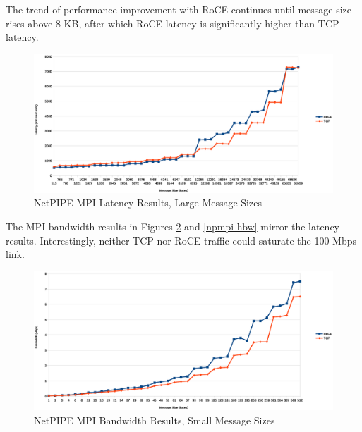 \documentclass[a4paper]{article}
\begin{document}
The trend of performance improvement with RoCE continues until message size
rises above 8 KB, after which RoCE latency is significantly higher than TCP
latency. %

\begin{figure}[H]
\includegraphics[width=\textwidth]{netpipe_lat_large}
\caption{NetPIPE MPI Latency Results, Large Message Sizes}
\label{npmpi-hlat}
\end{figure}

The MPI bandwidth results in Figures \ref{npmpi-lbw} and \ref{npmpi-hbw} mirror
the latency results. Interestingly, neither TCP nor RoCE traffic could saturate
the 100 Mbps link. %

\begin{figure}[H]
\includegraphics[width=\textwidth]{netpipe_bw_small}
\caption{NetPIPE MPI Bandwidth Results, Small Message Sizes}
\label{npmpi-lbw}
\end{figure}
\end{document}

